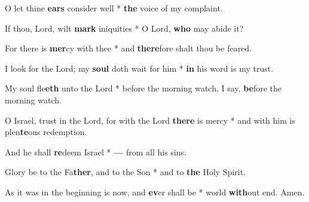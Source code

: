 \begin{multicols}{2}
	O let thine \textbf{ears} consider well * \textbf{the} voice of my complaint.
	
	If thou, Lord, wilt \textbf{mark} iniquities * O Lord, \textbf{who} may abide it?
	
	For there is \textbf{mer}cy with thee * and \textbf{there}fore shalt thou be feared.
	
	I look for the Lord; my \textbf{soul} doth wait for him * \textbf{in} his word is my trust.
	
	My soul fle\textbf{eth} unto the Lord * before the morning watch, I say, \textbf{be}fore the morning watch.
	
	O Israel, trust in the Lord, for with the Lord \textbf{there} is mercy * and with him is plen\textbf{te}ous redemption.
	
	And he shall \textbf{re}deem Israel * \textbf{---} from all his sins.
	
	Glory be to the Fa\textbf{ther}, and to the Son * and to \textbf{the} Holy Spirit.
	
	As it was in the beginning is now, and \textbf{ev}er shall be * world \textbf{with}out end. Amen.
\end{multicols}